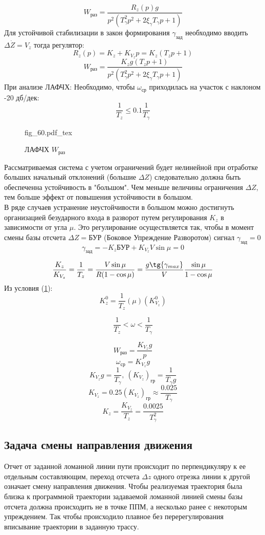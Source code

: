 \documentclass{article}
\newcommand{\incfig}[1]{
    {#1.pdf_tex}
}
\begin{document}
\[
	W_\text{раз} = \frac{R_z(p)g}{p^2(T_\gamma^2 p^2 + 2 \xi_\gamma T_\gamma p
		+ 1)}
\]
Для устойчивой стабилизации в закон формирования $\gamma_\text{зад}$ необходимо
вводить $\Delta \dot{Z} = V_{z}$ тогда регулятор:
\[
	R_z(p) = K_z + K_{V_z} p = K_z(T_z p +1)
\]
\[
	W_\text{раз} = \frac{K_z g(T_z p + 1)}{p^2(T_\gamma^2 p^2 + 2 \xi_\gamma
		T_\gamma p + 1)}
\]
При анализе ЛАФЧХ:
Необходимо, чтобы $ \omega_\text{ср}$ приходилась на участок с наклоном -20
дб/дек:
\begin{equation}
	\frac{1}{T_z} \le 0.1 \frac{1}{T_\gamma}
	\label{eq:a2}
\end{equation}

\begin{figure}[H]
	\centering
	\incfig{fig_60}
	\caption{ЛАФЧХ $W_\text{раз}$}
	\label{fig:fig_60}
\end{figure}

Рассматриваемая система с учетом ограничений будет нелинейной при отработке
больших начальный отклонений (большие $\Delta Z$) следовательно должна быть
обеспеченна устойчивость в "большом".
Чем меньше величины ограничения $\Delta Z$, тем больше эффект от повышения
устойчивости в большом.\\
В ряде случаев устранение неустойчивости в большом можно достигнуть
организацией безударного входа в разворот путем регулирования $K_z$ в
зависимости от угла $\mu$.
Это регулирование осуществляется так, чтобы в момент смены базы отсчета $\Delta
	Z = \text{БУР}$ (Боковое Упреждение Разворотом) сигнал $ \gamma_\text{зад} =
	0$
\[
	\gamma_\text{зад} = -K_z \text{БУР} + K_{V_z} V \sin{\mu} = 0
\]

\[
	\frac{K_z}{K_{V_z}} = \frac{1}{T_z} = \frac{V \sin{\mu}}{R( 1 - \cos{\mu})}
	= \frac{g \tg{\gamma_{max}}}{V} \frac{\sin{\mu}}{1 - \cos{\mu}}
\]
Из условия (\ref{fig:fig_60}):
\[
	K_z^0 = \frac{1}{T_z}(\mu)(K_{V_z}^0)
\]

\[
	\frac{1}{T_z} < \omega < \frac{1}{T_\gamma}
\]

\[
	W_\text{раз} = \frac{K_{V_z} g}{p}
\]
\[
	\omega_\text{ср} = K_{V_z} g
\]
\[
	K_{V_z} g = \frac{1}{T_\gamma} , \ (K_{V_z})_\text{гр} = \frac{1}{T_\gamma
		g}
\]
\[
	K_{V_z} = 0.25(K_{V_z})_\text{гр} \approx \frac{0.025}{T_{\gamma}}
\]
\[
	K_z = \frac{K_{V_z}}{T_z} = \frac{0.0025}{T_\gamma^2}
\]

\subsection{Задача смены направления движения}
Отчет от заданной ломанной линии пути происходит по перпендикуляру к ее
отдельным составляющим, переход отсчета $\Delta z$ одного отрезка линии к
другой означает смену направления движения. Чтобы реализуемая траектория была
близка к программной траектории задаваемой ломанной линией смены базы отсчета
должна происходить не в точке ППМ, а несколько ранее с некоторым упреждением.
Так чтобы происходило плавное без перерегулирования вписывание траектории в
заданную трассу.
\end{document}
